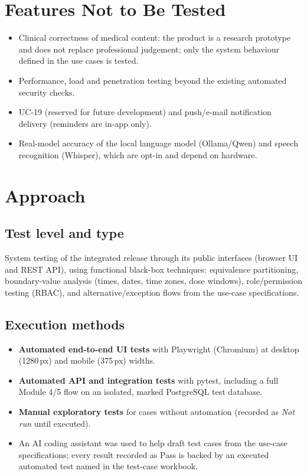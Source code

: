 \documentclass[10pt,letterpaper]{article}
\begin{document}
\section{Features Not to Be Tested}
\begin{itemize}
  \item Clinical correctness of medical content: the product is a research prototype and does not replace
        professional judgement; only the system behaviour defined in the use cases is tested.
  \item Performance, load and penetration testing beyond the existing automated security checks.
  \item UC-19 (reserved for future development) and push/e-mail notification delivery (reminders are in-app only).
  \item Real-model accuracy of the local language model (Ollama/Qwen) and speech recognition (Whisper), which
        are opt-in and depend on hardware.
\end{itemize}

\section{Approach}
\subsection{Test level and type}
System testing of the integrated release through its public interfaces (browser UI and REST API),
using functional black-box techniques: equivalence partitioning, boundary-value analysis (times, dates,
time zones, dose windows), role/permission testing (RBAC), and alternative/exception flows from the
use-case specifications.

\subsection{Execution methods}
\begin{itemize}
  \item \textbf{Automated end-to-end UI tests} with Playwright (Chromium) at desktop (1280\,px) and mobile (375\,px) widths.
  \item \textbf{Automated API and integration tests} with pytest, including a full Module 4/5 flow on an isolated,
        marked PostgreSQL test database.
  \item \textbf{Manual exploratory tests} for cases without automation (recorded as \emph{Not run} until executed).
  \item An AI coding assistant was used to help draft test cases from the use-case specifications; every result
        recorded as Pass is backed by an executed automated test named in the test-case workbook.
\end{itemize}
\end{document}
